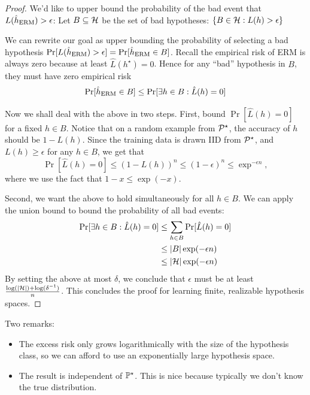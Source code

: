 \begin{proof}
    We’d like to upper bound the probability of the bad event that $L(\hat h_{\textup{ERM}}) > \epsilon$:
    Let $B \subseteq \mathcal{H}$ be the set of bad hypotheses: $\left\{B \in \mathcal{H} : L(h) > \epsilon\right\}$

    We can rewrite our goal as upper bounding the probability of selecting a bad hypothesis $\Pr[L(\hat h_{\textup{ERM}}) > \epsilon] = \Pr[\hat h_{\textup{ERM}} \in B]$.
    Recall the empirical risk of ERM is always zero because at least $\hat L(h^{\star}) = 0$.
    Hence for any “bad” hypothesis in $B$, they must have zero empirical risk
    \[ \Pr[\hat h_{\textup{ERM}} \in B] \le \Pr[\exists h \in B : \hat L(h) = 0] \]

    Now we shall deal with the above in two steps.
    First, bound $\Pr[ \hat L(h) = 0 ]$ for a fixed $h \in B$.
    Notice that on a random example from $\mathcal{P}^{\star}$, the accuracy of $h$ should be $1 - L(h)$.
    Since the training data is drawn IID from $\mathcal{P}^{\star}$, and $L(h) \ge \epsilon$ for any $h \in B$, we get that
    \[ \Pr[ \hat L(h) = 0 ] \le (1 - L(h))^{n} \le (1 - \epsilon)^n \le \exp^{-\epsilon n},  \]
    where we use the fact that $1 - x \le \exp(-x)$.

    Second, we want the above to hold simultaneously for all $h \in B$.
    We can apply the union bound to bound the probability of all bad events:
    \begin{align*} 
        \Pr[\exists h \in B : \hat L(h) = 0] &\le \sum_{h \in B} \Pr[ \hat L(h) = 0 ] \\
        & \le \left\lvert B\right\rvert \exp(- \epsilon n) \\
        & \le \left\lvert\mathcal{H}\right\rvert \exp( - \epsilon n)
    \end{align*}
    By setting the above at most $\delta$, we conclude that $\epsilon$ must be at least $\frac {\log(\left\lvert\mathcal{H}\right\rvert) + \log(\delta^{-1}) } n$.
    This concludes the proof for learning finite, realizable hypothesis spaces.
\end{proof}

Two remarks:
\begin{itemize}
    \item The excess risk only grows logarithmically with the size of the hypothesis class, so we can afford to use an exponentially large hypothesis space.

    \item The result is independent of $\mathbb{P}^{\star}$. This is nice because typically we don’t know the true distribution.
\end{itemize}

